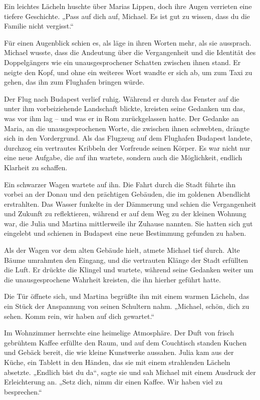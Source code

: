 \documentclass[
]{article}
\begin{document}
Ein leichtes Lächeln huschte über Marias Lippen, doch ihre Augen
verrieten eine tiefere Geschichte. „Pass auf dich auf, Michael. Es ist
gut zu wissen, dass du die Familie nicht vergisst.``

Für einen Augenblick schien es, als läge in ihren Worten mehr, als sie
aussprach. Michael wusste, dass die Andeutung über die Vergangenheit und
die Identität des Doppelgängers wie ein unausgesprochener Schatten
zwischen ihnen stand. Er neigte den Kopf, und ohne ein weiteres Wort
wandte er sich ab, um zum Taxi zu gehen, das ihn zum Flughafen bringen
würde.

Der Flug nach Budapest verlief ruhig. Während er durch das Fenster auf
die unter ihm vorbeiziehende Landschaft blickte, kreisten seine Gedanken
um das, was vor ihm lag -- und was er in Rom zurückgelassen hatte. Der
Gedanke an Maria, an die unausgesprochenen Worte, die zwischen ihnen
schwebten, drängte sich in den Vordergrund. Als das Flugzeug auf dem
Flughafen Budapest landete, durchzog ein vertrautes Kribbeln der
Vorfreude seinen Körper. Es war nicht nur eine neue Aufgabe, die auf ihn
wartete, sondern auch die Möglichkeit, endlich Klarheit zu schaffen.

Ein schwarzer Wagen wartete auf ihn. Die Fahrt durch die Stadt führte
ihn vorbei an der Donau und den prächtigen Gebäuden, die im goldenen
Abendlicht erstrahlten. Das Wasser funkelte in der Dämmerung und schien
die Vergangenheit und Zukunft zu reflektieren, während er auf dem Weg zu
der kleinen Wohnung war, die Julia und Martina mittlerweile ihr Zuhause
nannten. Sie hatten sich gut eingelebt und schienen in Budapest eine
neue Bestimmung gefunden zu haben.

Als der Wagen vor dem alten Gebäude hielt, atmete Michael tief durch.
Alte Bäume umrahmten den Eingang, und die vertrauten Klänge der Stadt
erfüllten die Luft. Er drückte die Klingel und wartete, während seine
Gedanken weiter um die unausgesprochene Wahrheit kreisten, die ihn
hierher geführt hatte.

Die Tür öffnete sich, und Martina begrüßte ihn mit einem warmen Lächeln,
das ein Stück der Anspannung von seinen Schultern nahm. „Michael, schön,
dich zu sehen. Komm rein, wir haben auf dich gewartet.``

Im Wohnzimmer herrschte eine heimelige Atmosphäre. Der Duft von frisch
gebrühtem Kaffee erfüllte den Raum, und auf dem Couchtisch standen
Kuchen und Gebäck bereit, die wie kleine Kunstwerke aussahen. Julia kam
aus der Küche, ein Tablett in den Händen, das sie mit einem strahlenden
Lächeln absetzte. „Endlich bist du da``, sagte sie und sah Michael mit
einem Ausdruck der Erleichterung an. „Setz dich, nimm dir einen Kaffee.
Wir haben viel zu besprechen.``
\end{document}
